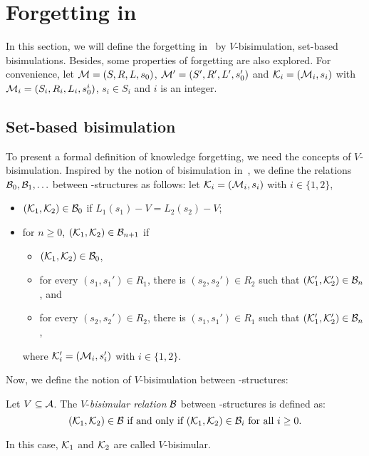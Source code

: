 \documentclass{article}
\begin{document}
\section{Forgetting in \CTL}
In this section, we will define the forgetting in \CTL\ by $V$-bisimulation, set-based bisimulations.
Besides, some properties of forgetting are also explored.
For convenience, let ${\cal M}=(S, R, L, s_0)$, ${\cal M}'=(S',R',L',s_0')$ and ${\cal K}_i=({\cal M}_i, s_i)$ with ${\cal M}_i=(S_i, R_i,L_i, s_0^i)$, $s_i \in S_i$ and $i$ is an integer.
\subsection{Set-based bisimulation}
To present a formal definition of knowledge forgetting, we need the concepts of $V$-bisimulation.
Inspired by the notion of bisimulation in~\cite{DBLP:journals/tcs/BrowneCG88}, we define the relations ${\cal B}_0,{\cal B}_1,\ldots$
between \MPK-structures as follows: let
${\cal K}_i=({\cal M}_i,s_i)$ with $i\in\{1,2\}$,
\begin{itemize}
  \item $({\cal K}_1,{\cal K}_2)\in{\cal B}_0$ if $L_1(s_1)-V=L_2(s_2)-V$;  %
  \item for $n\ge 0$, $({\cal K}_1,{\cal K}_2)\in{\cal B}_{n+1}$ if
  \begin{itemize}
    \item $({\cal K}_1,{\cal K}_2)\in{\cal B}_0$,
    \item for every $(s_1,s_1')\in R_1$, there is $(s_2,s_2')\in R_2$
    such that $({\cal K}_1',{\cal K}_2')\in {\cal B}_n$, and
    \item for every $(s_2,s_2')\in R_2$, there is $(s_1,s_1')\in R_1$
    such that $({\cal K}_1',{\cal K}_2')\in {\cal B}_n$,
  \end{itemize}
  where ${\cal K}_i'=({\cal M}_i,s_i')$ with $i\in\{1,2\}$.
\end{itemize}

Now, we define the notion of $V$-bisimulation between \MPK-structures:
\begin{definition}[$V$-bisimulation]
  \label{def:V-bisimulation}
   Let $V\subseteq\cal A$. The $V$-{\em bisimular relation} ${\cal B}$ between
   \MPK-structures is defined as:
  \[({\cal K}_1,{\cal K}_2)\in {\cal B}\mbox{ if and only if } ({\cal K}_1,{\cal K}_2)\in {{\cal B}_i}\mbox{ for all }i\ge 0.\]
\end{definition}
In this case, ${\cal K}_1$ and ${\cal K}_2$ are called $V$-bisimular.
\end{document}
